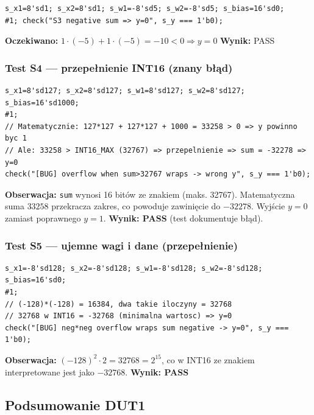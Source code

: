 \documentclass[12pt,a4paper]{article}
\begin{document}
\begin{lstlisting}
s_x1=8'sd1; s_x2=8'sd1; s_w1=-8'sd5; s_w2=-8'sd5; s_bias=16'sd0;
#1; check("S3 negative sum => y=0", s_y === 1'b0);
\end{lstlisting}

\textbf{Oczekiwano:} $1 \cdot (-5) + 1 \cdot (-5) = -10 < 0 \Rightarrow y = 0$ \quad \textbf{Wynik:} PASS

\subsubsection*{Test S4 — przepełnienie INT16 (znany błąd)}

\begin{lstlisting}
s_x1=8'sd127; s_x2=8'sd127; s_w1=8'sd127; s_w2=8'sd127;
s_bias=16'sd1000;
#1;
// Matematycznie: 127*127 + 127*127 + 1000 = 33258 > 0 => y powinno byc 1
// Ale: 33258 > INT16_MAX (32767) => przepelnienie => sum = -32278 => y=0
check("[BUG] overflow when sum>32767 wraps -> wrong y", s_y === 1'b0);
\end{lstlisting}

\begin{infobox}
\textbf{Obserwacja:} \texttt{sum} wynosi 16 bitów ze znakiem (maks. 32767). Matematyczna suma $33258$ przekracza zakres, co powoduje zawinięcie do $-32278$. Wyjście $y=0$ zamiast poprawnego $y=1$. \textbf{Wynik: PASS} (test dokumentuje błąd).
\end{infobox}

\subsubsection*{Test S5 — ujemne wagi i dane (przepełnienie)}

\begin{lstlisting}
s_x1=-8'sd128; s_x2=-8'sd128; s_w1=-8'sd128; s_w2=-8'sd128;
s_bias=16'sd0;
#1;
// (-128)*(-128) = 16384, dwa takie iloczyny = 32768
// 32768 w INT16 = -32768 (minimalna wartosc) => y=0
check("[BUG] neg*neg overflow wraps sum negative -> y=0", s_y === 1'b0);
\end{lstlisting}

\textbf{Obserwacja:} $(-128)^2 \cdot 2 = 32768 = 2^{15}$, co w INT16 ze znakiem interpretowane jest jako $-32768$. \textbf{Wynik: PASS}

\subsection{Podsumowanie DUT1}
\end{document}
